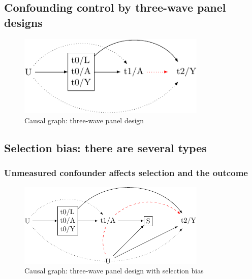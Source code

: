 \documentclass[
  singlecolumn]{report}
\begin{document}
\hypertarget{confounding-control-by-three-wave-panel-designs}{%
\subsection{Confounding control by three-wave panel
designs}\label{confounding-control-by-three-wave-panel-designs}}

\begin{figure}

{\centering \includegraphics[width=0.8\textwidth,height=\textheight]{causal-dags_files/figure-pdf/fig-dag-6-1.pdf}

}

\caption{\label{fig-dag-6}Causal graph: three-wave panel design}

\end{figure}

\hypertarget{selection-bias-there-are-several-types}{%
\subsection{Selection bias: there are several
types}\label{selection-bias-there-are-several-types}}

\hypertarget{unmeasured-confounder-affects-selection-and-the-outcome}{%
\subsubsection{Unmeasured confounder affects selection and the
outcome}\label{unmeasured-confounder-affects-selection-and-the-outcome}}

\begin{figure}

{\centering \includegraphics[width=0.8\textwidth,height=\textheight]{causal-dags_files/figure-pdf/fig-dag-8-1.pdf}

}

\caption{\label{fig-dag-8}Causal graph: three-wave panel design with
selection bias}

\end{figure}
\end{document}
